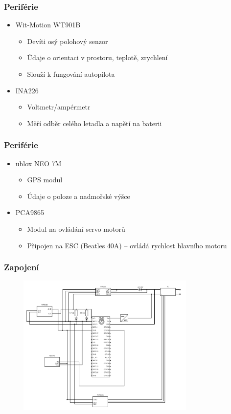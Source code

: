 \documentclass[aspectratio=43]{beamer}
\begin{document}
\begin{frame}[fragile]
	\frametitle{Periférie}
	\begin{itemize}
		\item Wit-Motion WT901B
			\begin{itemize}
				\item Devíti osý polohový senzor
				\item Údaje o orientaci v prostoru, teplotě, zrychlení
				\item Slouží k fungování autopilota
			\end{itemize}
		\item INA226
			\begin{itemize}
				\item Voltmetr/ampérmetr
				\item Měří odběr celého letadla a napětí na baterii
			\end{itemize}
	\end{itemize}
\end{frame}

\begin{frame}[fragile]
	\frametitle{Periférie}
	\begin{itemize}
		\item ublox NEO 7M
			\begin{itemize}
				\item GPS modul
				\item Údaje o poloze a nadmořské výšce
			\end{itemize}
		\item PCA9865
			\begin{itemize}
				\item Modul na ovládání servo motorů
				\item Připojen na ESC (Beatles 40A) -- ovládá rychlost hlavního motoru
			\end{itemize}
	\end{itemize}
\end{frame}

\begin{frame}[fragile]
	\frametitle{Zapojení}
	\begin{figure}[h]
		\centering
		\includegraphics[height=7cm]{./../img/schema.png}
	\end{figure}
\end{frame}
\end{document}
